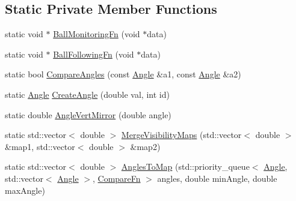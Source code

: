 \subsection*{Static Private Member Functions}
\begin{DoxyCompactItemize}
\item 
static void $\ast$ \hyperlink{classBallMonitor_af76da8bc13e92d9083a9a77469c472df}{BallMonitoringFn} (void $\ast$data)
\item 
static void $\ast$ \hyperlink{classBallMonitor_a2ca3e25f437b5aabb3bc88e0f84cf9a5}{BallFollowingFn} (void $\ast$data)
\item 
static bool \hyperlink{classBallMonitor_a78114ec7fc20317f84491e428dd8c126}{CompareAngles} (const \hyperlink{structBallMonitor_1_1Angle}{Angle} \&a1, const \hyperlink{structBallMonitor_1_1Angle}{Angle} \&a2)
\item 
static \hyperlink{structBallMonitor_1_1Angle}{Angle} \hyperlink{classBallMonitor_a805b7229e7db773c56e9987d794ada9a}{CreateAngle} (double val, int id)
\item 
static double \hyperlink{classBallMonitor_a32d7b6d877b84c7d7fd9bc9ffe659562}{AngleVertMirror} (double angle)
\item 
static std::vector$<$ double $>$ \hyperlink{classBallMonitor_a74f8a1ce881528e475269fa1c964fa61}{MergeVisibilityMaps} (std::vector$<$ double $>$ \&map1, std::vector$<$ double $>$ \&map2)
\item 
static std::vector$<$ double $>$ \hyperlink{classBallMonitor_a8f3198b6b4ef8eb52c0ff04afd33cc8f}{AnglesToMap} (std::priority\_\-queue$<$ \hyperlink{structBallMonitor_1_1Angle}{Angle}, std::vector$<$ \hyperlink{structBallMonitor_1_1Angle}{Angle} $>$, \hyperlink{classBallMonitor_a5ad781c99d5b43bee7c838de9da75527}{CompareFn} $>$ angles, double minAngle, double maxAngle)
\end{DoxyCompactItemize}
